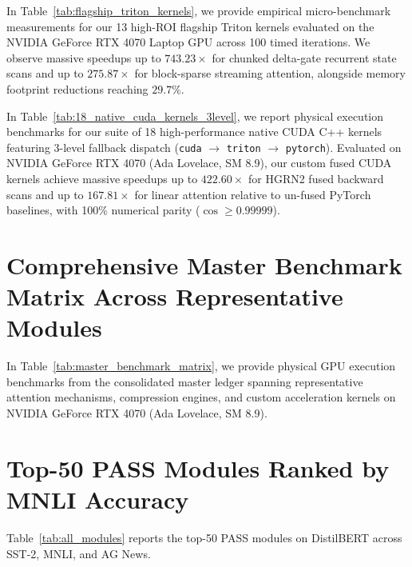 \documentclass{article}
\begin{document}
\vspace{0.5em}
In Table~\ref{tab:flagship_triton_kernels}, we provide empirical micro-benchmark measurements for our 13 high-ROI flagship Triton kernels evaluated on the NVIDIA GeForce RTX 4070 Laptop GPU across 100 timed iterations. We observe massive speedups up to $743.23\times$ for chunked delta-gate recurrent state scans and up to $275.87\times$ for block-sparse streaming attention, alongside memory footprint reductions reaching $29.7\%$.


\vspace{0.5em}
In Table~\ref{tab:18_native_cuda_kernels_3level}, we report physical execution benchmarks for our suite of 18 high-performance native CUDA C++ kernels featuring 3-level fallback dispatch (\texttt{cuda} $\to$ \texttt{triton} $\to$ \texttt{pytorch}). Evaluated on NVIDIA GeForce RTX 4070 (Ada Lovelace, SM 8.9), our custom fused CUDA kernels achieve massive speedups up to $422.60\times$ for HGRN2 fused backward scans and up to $167.81\times$ for linear attention relative to un-fused PyTorch baselines, with 100\% numerical parity ($\cos \ge 0.99999$).


\clearpage
\section{Comprehensive Master Benchmark Matrix Across Representative Modules}
\label{app:master_benchmark_matrix}
In Table~\ref{tab:master_benchmark_matrix}, we provide physical GPU execution benchmarks from the consolidated master ledger spanning representative attention mechanisms, compression engines, and custom acceleration kernels on NVIDIA GeForce RTX 4070 (Ada Lovelace, SM 8.9).


\clearpage
\section{Top-50 PASS Modules Ranked by MNLI Accuracy}
\label{app:top50}
Table~\ref{tab:all_modules} reports the top-50 PASS modules on DistilBERT across SST-2, MNLI, and AG News.


\clearpage
\end{document}
